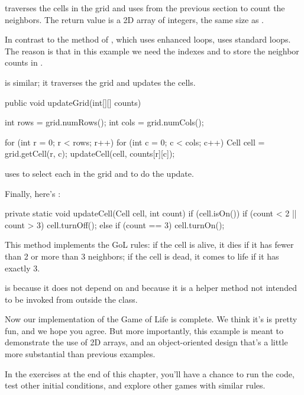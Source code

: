  traverses the cells in the grid and uses  from the previous section to count the neighbors.
The return value is a 2D array of integers, the same size as .

In contrast to the  method of , which uses enhanced  loops,  uses standard  loops.
The reason is that in this example we need the indexes  and  to store the neighbor counts in .

 is similar; it traverses the grid and updates the cells.

\begin{code}
public void updateGrid(int[][] counts) {
    int rows = grid.numRows();
    int cols = grid.numCols();

    for (int r = 0; r < rows; r++) {
        for (int c = 0; c < cols; c++) {
            Cell cell = grid.getCell(r, c);
            updateCell(cell, counts[r][c]);
        }
    }
}
\end{code}

 uses  to select each  in the grid and  to do the update.

Finally, here's :

\begin{code}
private static void updateCell(Cell cell, int count) {
    if (cell.isOn()) {
        if (count < 2 || count > 3) {
            cell.turnOff();
        }
    } else {
        if (count == 3) {
            cell.turnOn();
        }
    }
}
\end{code}

This method implements the GoL rules: if the cell is alive, it dies if it has fewer than 2 or more than 3 neighbors; if the cell is dead, it comes to life if it has exactly 3.

 is  because it does not depend on  and  because it is a helper method not intended to be invoked from outside the class.

Now our implementation of the Game of Life is complete.
We think it's is pretty fun, and we hope you agree.
But more importantly, this example is meant to demonstrate the use of 2D arrays, and an object-oriented design that's a little more substantial than previous examples.

In the exercises at the end of this chapter, you'll have a chance to run the code, test other initial conditions, and explore other games with similar rules.


